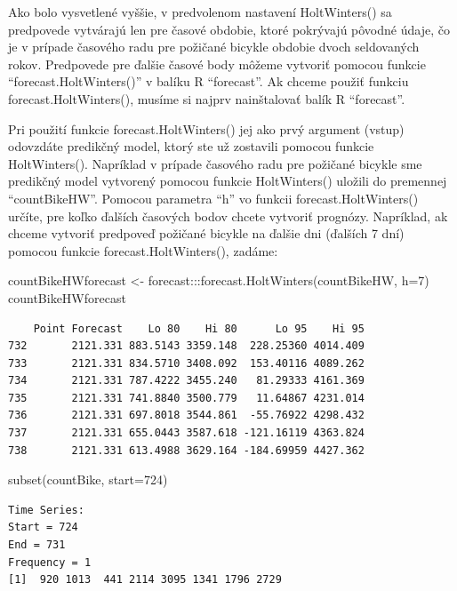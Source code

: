 \documentclass[
  letterpaper,
  DIV=11,
  numbers=noendperiod]{scrreprt}
\newenvironment{Shaded}{\begin{snugshade}}{\end{snugshade}}
\newcommand{\AttributeTok}[1]{\textcolor[rgb]{0.40,0.45,0.13}{#1}}
\newcommand{\DecValTok}[1]{\textcolor[rgb]{0.68,0.00,0.00}{#1}}
\newcommand{\FunctionTok}[1]{\textcolor[rgb]{0.28,0.35,0.67}{#1}}
\newcommand{\NormalTok}[1]{\textcolor[rgb]{0.00,0.23,0.31}{#1}}
\newcommand{\OtherTok}[1]{\textcolor[rgb]{0.00,0.23,0.31}{#1}}
\newcommand{\SpecialCharTok}[1]{\textcolor[rgb]{0.37,0.37,0.37}{#1}}
\begin{document}
Ako bolo vysvetlené vyššie, v predvolenom nastavení HoltWinters() sa
predpovede vytvárajú len pre časové obdobie, ktoré pokrývajú pôvodné
údaje, čo je v prípade časového radu pre požičané bicykle obdobie dvoch
seldovaných rokov. Predpovede pre ďalšie časové body môžeme vytvoriť
pomocou funkcie ``forecast.HoltWinters()'' v balíku R ``forecast''. Ak
chceme použiť funkciu forecast.HoltWinters(), musíme si najprv
nainštalovať balík R ``forecast''.

Pri použití funkcie forecast.HoltWinters() jej ako prvý argument (vstup)
odovzdáte predikčný model, ktorý ste už zostavili pomocou funkcie
HoltWinters(). Napríklad v prípade časového radu pre požičané bicykle
sme predikčný model vytvorený pomocou funkcie HoltWinters() uložili do
premennej ``countBikeHW''. Pomocou parametra ``h'' vo funkcii
forecast.HoltWinters() určíte, pre koľko ďalších časových bodov chcete
vytvoriť prognózy. Napríklad, ak chceme vytvoriť predpoveď požičané
bicykle na ďalšie dni (ďalších 7 dní) pomocou funkcie
forecast.HoltWinters(), zadáme:

\begin{Shaded}
\begin{Highlighting}[]
\NormalTok{countBikeHWforecast }\OtherTok{\textless{}{-}}\NormalTok{ forecast}\SpecialCharTok{:::}\FunctionTok{forecast.HoltWinters}\NormalTok{(countBikeHW, }\AttributeTok{h=}\DecValTok{7}\NormalTok{)}
\NormalTok{countBikeHWforecast}
\end{Highlighting}
\end{Shaded}

\begin{verbatim}
    Point Forecast    Lo 80    Hi 80      Lo 95    Hi 95
732       2121.331 883.5143 3359.148  228.25360 4014.409
733       2121.331 834.5710 3408.092  153.40116 4089.262
734       2121.331 787.4222 3455.240   81.29333 4161.369
735       2121.331 741.8840 3500.779   11.64867 4231.014
736       2121.331 697.8018 3544.861  -55.76922 4298.432
737       2121.331 655.0443 3587.618 -121.16119 4363.824
738       2121.331 613.4988 3629.164 -184.69959 4427.362
\end{verbatim}

\begin{Shaded}
\begin{Highlighting}[]
\FunctionTok{subset}\NormalTok{(countBike, }\AttributeTok{start=}\DecValTok{724}\NormalTok{)}
\end{Highlighting}
\end{Shaded}

\begin{verbatim}
Time Series:
Start = 724 
End = 731 
Frequency = 1 
[1]  920 1013  441 2114 3095 1341 1796 2729
\end{verbatim}
\end{document}

